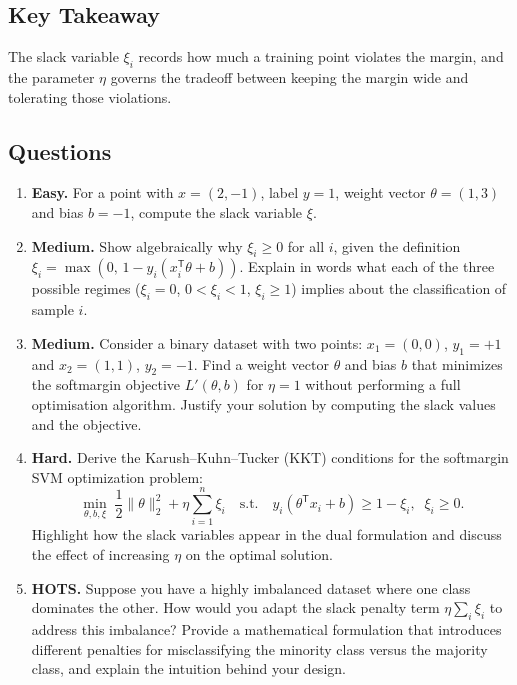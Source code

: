 \documentclass[12pt, a4paper]{article}
\begin{document}
\subsection{Key Takeaway}  
The slack variable \(\xi_i\) records how much a training point violates the margin, and the parameter \(\eta\) governs the tradeoff between keeping the margin wide and tolerating those violations.

\subsection*{Questions}

\begin{enumerate}
    \item \textbf{Easy.}  
    For a point with \(x=(2, -1)\), label \(y=1\), weight vector \(\theta = (1, 3)\) and bias \(b=-1\), compute the slack variable \(\xi\).  
    \newpage

    \item \textbf{Medium.}  
    Show algebraically why \(\xi_i\ge 0\) for all \(i\), given the definition \(\xi_i = \max(0,\,1 - y_i(x_i^{\mathsf T}\theta + b))\). Explain in words what each of the three possible regimes (\(\xi_i=0\), \(0<\xi_i<1\), \(\xi_i\ge 1\)) implies about the classification of sample \(i\).  
    \newpage

    \item \textbf{Medium.}  
    Consider a binary dataset with two points: \(x_1=(0,0)\), \(y_1=+1\) and \(x_2=(1,1)\), \(y_2=-1\).  
    Find a weight vector \(\theta\) and bias \(b\) that minimizes the softmargin objective \(L'(\theta,b)\) for \(\eta = 1\) without performing a full optimisation algorithm.  Justify your solution by computing the slack values and the objective.  
    \newpage

    \item \textbf{Hard.}  
    Derive the Karush--Kuhn--Tucker (KKT) conditions for the softmargin SVM optimization problem:
    \[
    \min_{\theta,b,\xi} \;\frac{1}{2}\|\theta\|_2^2 + \eta \sum_{i=1}^n \xi_i
    \quad\text{s.t.}\quad y_i(\theta^{\mathsf T}x_i + b) \ge 1 - \xi_i,\;\;\xi_i\ge 0.
    \]
    Highlight how the slack variables appear in the dual formulation and discuss the effect of increasing \(\eta\) on the optimal solution.  
    \newpage

    \item \textbf{HOTS.}  
    Suppose you have a highly imbalanced dataset where one class dominates the other. How would you adapt the slack penalty term \(\eta\sum_{i}\xi_i\) to address this imbalance? Provide a mathematical formulation that introduces different penalties for misclassifying the minority class versus the majority class, and explain the intuition behind your design.  
    \newpage
\end{enumerate}
\end{document}
